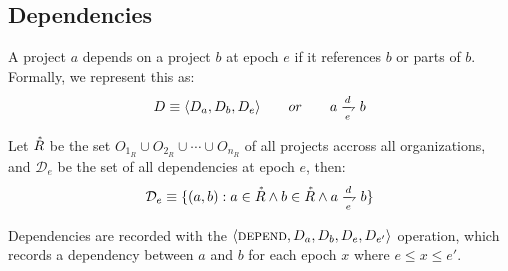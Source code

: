 \subsection{Dependencies}
\label{dependencies}

A project $a$ depends on a project $b$ at epoch $e$ if it references $b$
or parts of $b$. Formally, we represent this as:
\[
    D \equiv \tuple{D_a, D_b, D_e} \qquad or \qquad a \dep b
\]


Let $\accentset{*}{R}$ be the set $O_{1_R} \cup O_{2_R} \cup \cdots \cup
O_{n_R}$ of all projects accross all organizations, and $\mathcal{D}_e$ be the
set of all dependencies at epoch $e$, then:
\[
    \mathcal{D}_e \equiv \{(a, b) : a \in \accentset{*}{R}
    \land b \in \accentset{*}{R}
    \land a \dep b \}
\]

Dependencies are recorded with the $\langle \text{\normalfont\scshape depend}, D_a, D_b, D_e, D_{e'} \rangle$
operation, which records a dependency between $a$ and $b$ for each epoch $x$
where $e \leqslant x \leqslant e'$.
